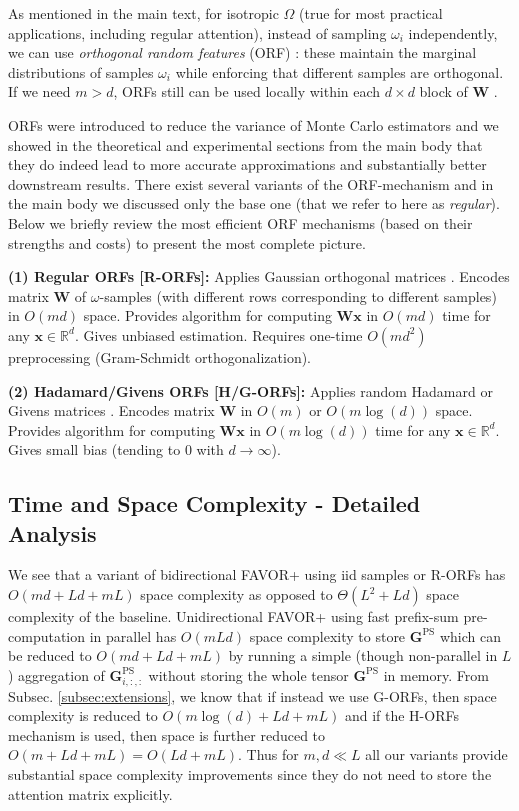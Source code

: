 As mentioned in the main text, for isotropic $\Omega$ (true for most practical applications, including regular attention), instead of sampling $\omega_{i}$ independently, we can use \emph{orthogonal random features} (ORF) \citep{ort, unreas, geom}: these maintain the marginal distributions of samples $\omega_{i}$ while enforcing that different samples are orthogonal. If we need $m>d$, ORFs still can be used locally within each $d \times d$ block of $\mathbf{W}$ \citep{ort}.

ORFs were introduced to reduce the variance of Monte Carlo estimators \citep{ort, unreas, geom, kama, hron,psrnn, uni} and we showed in the theoretical and experimental sections from the main body that they do indeed lead to more accurate approximations and substantially better downstream results. There exist several variants of the ORF-mechanism and in the main body we discussed only the base one (that we refer to here as \textit{regular}). Below we briefly review the most efficient ORF mechanisms (based on their strengths and costs) to present the most complete picture.

\textbf{(1) Regular ORFs [R-ORFs]:} Applies Gaussian orthogonal matrices \citep{ort}. Encodes matrix $\mathbf{W}$ of $\omega$-samples (with different rows corresponding to different samples) in $O(md)$ space. Provides algorithm for computing $\mathbf{Wx}$ in $O(md)$ time for any $\mathbf{x} \in \mathbb{R}^{d}$. Gives unbiased estimation. Requires one-time $O(md^{2})$ preprocessing (Gram-Schmidt orthogonalization).

\textbf{(2) Hadamard/Givens ORFs [H/G-ORFs]:} Applies random Hadamard \citep{unreas} or Givens matrices \citep{uni}. Encodes matrix $\mathbf{W}$ in $O(m)$ or $O(m\log(d))$ space. Provides algorithm for computing $\mathbf{Wx}$ in $O(m\log(d))$ time for any $\mathbf{x} \in \mathbb{R}^{d}$. Gives small bias (tending to $0$ with $d \rightarrow \infty$).

\subsection{Time and Space Complexity - Detailed Analysis}

We see that a variant of bidirectional FAVOR+ using iid samples or R-ORFs has $O(md+Ld+mL)$ space complexity as opposed to $\Theta(L^{2} + Ld)$ space complexity of the baseline. Unidirectional FAVOR+ using fast prefix-sum pre-computation in parallel \citep{cumsum, cormen} has $O(m L d)$ space complexity to store $\mathbf{G}^\textrm{PS}$ which can be reduced to $O(md+Ld+mL)$ by running a simple (though non-parallel in $L$) aggregation of $\mathbf{G}^\textrm{PS}_{i,:,:}$ without storing the whole tensor $\mathbf{G}^{\textrm{PS}}$ in memory. From Subsec. \ref{subsec:extensions}, we know that if instead we use G-ORFs, then space complexity is reduced to $O(m\log(d) + Ld + mL)$ and if the H-ORFs mechanism is used, then space is further reduced to $O(m + Ld + mL)=O(Ld+mL)$. Thus for $m,d \ll L$ all our variants provide substantial space complexity improvements since they do not need to store the attention matrix explicitly.

